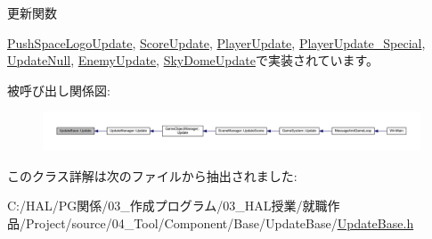 更新関数 



\mbox{\hyperlink{class_push_space_logo_update_aa07fe6f6f4f072e1f81bc6708dd4727e}{Push\+Space\+Logo\+Update}}, \mbox{\hyperlink{class_score_update_aae2b398784079a651ed92eb4c634b1c9}{Score\+Update}}, \mbox{\hyperlink{class_player_update_af6e1b8ca60399f232e64d2acb4968c75}{Player\+Update}}, \mbox{\hyperlink{class_player_update___special_afef3503e292dbaded809068fd87deadd}{Player\+Update\+\_\+\+Special}}, \mbox{\hyperlink{class_update_null_a692f4f34e4ef35ca286a1d3606fdf473}{Update\+Null}}, \mbox{\hyperlink{class_enemy_update_ae9662f3a2d064dc69c0d68293e60f051}{Enemy\+Update}}, \mbox{\hyperlink{class_sky_dome_update_ae163cb90e4de561fe1f7b2cb311be331}{Sky\+Dome\+Update}}で実装されています。

被呼び出し関係図\+:
\nopagebreak
\begin{figure}[H]
\begin{center}
\leavevmode
\includegraphics[width=350pt]{class_update_base_a9fdc8924001cf6fa89c1f5fa0d867682_icgraph}
\end{center}
\end{figure}


このクラス詳解は次のファイルから抽出されました\+:\begin{DoxyCompactItemize}
\item 
C\+:/\+H\+A\+L/\+P\+G関係/03\+\_\+作成プログラム/03\+\_\+\+H\+A\+L授業/就職作品/\+Project/source/04\+\_\+\+Tool/\+Component/\+Base/\+Update\+Base/\mbox{\hyperlink{_update_base_8h}{Update\+Base.\+h}}\end{DoxyCompactItemize}
